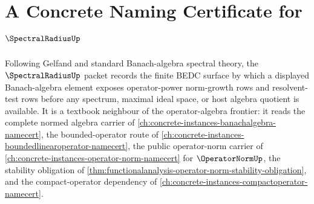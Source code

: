 \chapter{A Concrete Naming Certificate for $\SpectralRadiusUp$}
\label{ch:concrete-instances-spectral-radius-namecert}

Following Gelfand and standard Banach-algebra spectral theory, the $\SpectralRadiusUp$ packet records the finite BEDC surface by which a displayed Banach-algebra element exposes operator-power norm-growth rows and resolvent-test rows before any spectrum, maximal ideal space, or host algebra quotient is available. It is a textbook neighbour of the operator-algebra frontier: it reads the complete normed algebra carrier of \autoref{ch:concrete-instances-banachalgebra-namecert}, the bounded-operator route of \autoref{ch:concrete-instances-boundedlinearoperator-namecert}, the public operator-norm carrier of \autoref{ch:concrete-instances-operator-norm-namecert} for $\OperatorNormUp$, the stability obligation of \autoref{thm:functionalanalysis-operator-norm-stability-obligation}, and the compact-operator dependency of \autoref{ch:concrete-instances-compactoperator-namecert}.


